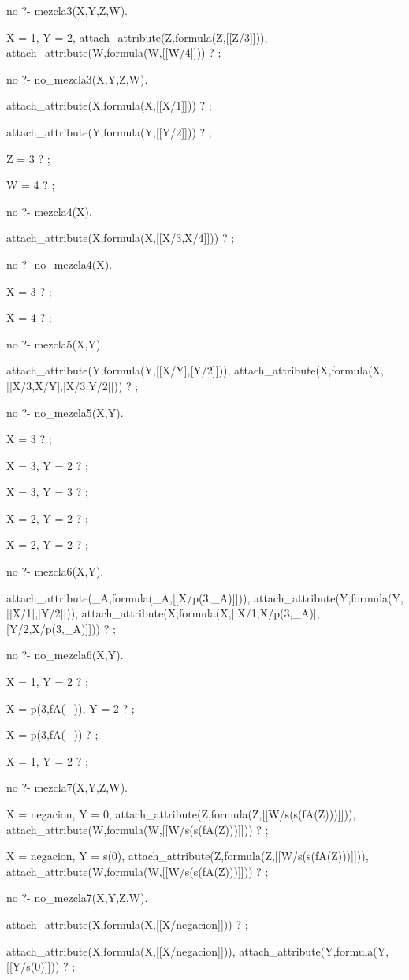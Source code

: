 no
?- mezcla3(X,Y,Z,W).

X = 1,
Y = 2,
attach_attribute(Z,formula(Z,[[Z/3]])),
attach_attribute(W,formula(W,[[W/4]])) ? ;

no
?- no_mezcla3(X,Y,Z,W).

attach_attribute(X,formula(X,[[X/1]])) ? ;

attach_attribute(Y,formula(Y,[[Y/2]])) ? ;

Z = 3 ? ;

W = 4 ? ;

no
?- mezcla4(X).

attach_attribute(X,formula(X,[[X/3,X/4]])) ? ;

no
?- no_mezcla4(X).

X = 3 ? ;

X = 4 ? ;

no
?- mezcla5(X,Y).

attach_attribute(Y,formula(Y,[[X/Y],[Y/2]])),
attach_attribute(X,formula(X,[[X/3,X/Y],[X/3,Y/2]])) ? ;

no
?- no_mezcla5(X,Y).

X = 3 ? ;

X = 3,
Y = 2 ? ;

X = 3,
Y = 3 ? ;

X = 2,
Y = 2 ? ;

X = 2,
Y = 2 ? ;

no
?- mezcla6(X,Y).

attach_attribute(_A,formula(_A,[[X/p(3,_A)]])),
attach_attribute(Y,formula(Y,[[X/1],[Y/2]])),
attach_attribute(X,formula(X,[[X/1,X/p(3,_A)],[Y/2,X/p(3,_A)]])) ? ;

no
?- no_mezcla6(X,Y).

X = 1,
Y = 2 ? ;

X = p(3,fA(_)),
Y = 2 ? ;

X = p(3,fA(_)) ? ;

X = 1,
Y = 2 ? ;

no
?- mezcla7(X,Y,Z,W).

X = negacion,
Y = 0,
attach_attribute(Z,formula(Z,[[W/s(s(fA(Z)))]])),
attach_attribute(W,formula(W,[[W/s(s(fA(Z)))]])) ? ;

X = negacion,
Y = s(0),
attach_attribute(Z,formula(Z,[[W/s(s(fA(Z)))]])),
attach_attribute(W,formula(W,[[W/s(s(fA(Z)))]])) ? ;

no
?- no_mezcla7(X,Y,Z,W).

attach_attribute(X,formula(X,[[X/negacion]])) ? ;

attach_attribute(X,formula(X,[[X/negacion]])),
attach_attribute(Y,formula(Y,[[Y/s(0)]])) ? ;

